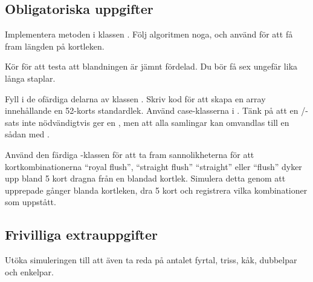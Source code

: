 \subsection{Obligatoriska uppgifter}

\Task 
\Subtask Implementera metoden  i klassen . Följ algoritmen noga, och använd  för att få fram längden på kortleken. 

\Subtask Kör  för att testa att blandningen är jämnt fördelad. Du bör få sex ungefär lika långa staplar.

\Task Fyll i de ofärdiga delarna av klassen . Skriv kod för att skapa en array innehållande en 52-korts standardlek. Använd case-klasserna i . Tänk på att en /-sats inte nödvändigtvis ger en , men att alla samlingar kan omvandlas till en sådan med .

\Task Använd den färdiga -klassen för att ta fram sannolikheterna för att kortkombinationerna ``royal flush'', ``straight flush'' ``straight'' eller ``flush'' dyker upp bland 5 kort dragna från en blandad kortlek. Simulera detta genom att upprepade gånger blanda kortleken, dra 5 kort och registrera vilka kombinationer som uppstått. 


\subsection{Frivilliga extrauppgifter}

\Task Utöka simuleringen till att även ta reda på antalet fyrtal, triss, kåk, dubbelpar och enkelpar.
